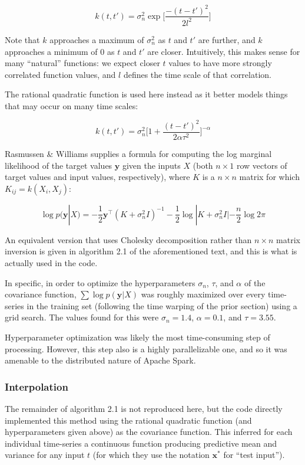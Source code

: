 \documentclass[journal]{IEEEtran}
\begin{document}
$$k(t,t') = \sigma_n^2\exp\bigg[\frac{-(t-t')^2}{2l^2}\bigg]$$

Note that $k$ approaches a maximum of $\sigma_n^2$ as $t$ and $t'$ are
further, and $k$ approaches a minimum of 0 as $t$ and $t'$ are closer.
Intuitively, this makes sense for many ``natural'' functions: we
expect closer $t$ values to have more strongly correlated function
values, and $l$ defines the time scale of that correlation.

The rational quadratic function is used here instead as it better
models things that may occur on many time scales\cite{Lasko2013}:

$$k(t,t') = \sigma_n^2\bigg[1+\frac{(t-t')^2}{2\alpha\tau^2}\bigg]^{-\alpha}$$

Rasmussen \& Williams\cite{Rasmussen2004} supplies a formula for
computing the log marginal likelihood of the target values
$\mathbf{y}$ given the inputs $X$ (both $n\times1$ row vectors of
target values and input values, respectively), where $K$ is a $n\times
n$ matrix for which $K_{ij}=k(X_i,X_j)$:

$$\log p(\mathbf{y}|X) = -\frac{1}{2}\mathbf{y}^\top(K+\sigma_n^2I)^{-1}-\frac{1}{2}\log |K+\sigma_n^2I|-\frac{n}{2}\log2\pi$$

An equivalent version that uses Cholesky decomposition rather than
$n\times n$ matrix inversion is given in algorithm 2.1 of the
aforementioned text, and this is what is actually used in the code.

In specific, in order to optimize the hyperparameters $\sigma_n$,
$\tau$, and $\alpha$ of the covariance function, $\sum\log
p(\mathbf{y}|X)$ was roughly maximized over every time-series in the
training set (following the time warping of the prior section) using a
grid search.  The values found for this were $\sigma_n=1.4$,
$\alpha=0.1$, and $\tau=3.55$.

Hyperparameter optimization was likely the most time-consuming step of
processing.  However, this step also is a highly parallelizable one,
and so it was amenable to the distributed nature of Apache Spark.

\subsubsection{Interpolation}

The remainder of algorithm 2.1 is not reproduced here, but the code
directly implemented this method using the rational quadratic function
(and hyperparameters given above) as the covariance function.  This
inferred for each individual time-series a continuous function
producing predictive mean and variance for any input $t$ (for which
they use the notation $\mathbf{x^*}$ for ``test input'').
\end{document}
